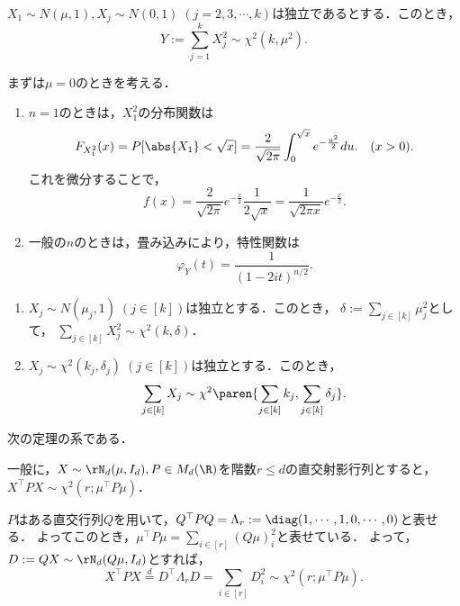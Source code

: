 \documentclass[uplatex,dvipdfmx]{jsreport}
\begin{document}
\begin{theorem}
    $X_1\sim N(\mu,1),X_j\sim N(0,1)\;(j=2,3,\cdots,k)$は独立であるとする．このとき，
    \[Y:=\sum_{j=1}^kX_j^2\sim\chi^2(k,\mu^2).\]
\end{theorem}
\begin{Proof}
    まずは$\mu=0$のときを考える．
    \begin{enumerate}
        \item $n=1$のときは，$X_1^2$の分布関数は
        \[F_{X_1^2}(x)=P[\abs{X_1}<\sqrt{x}]=\frac{2}{\sqrt{2\pi}}\int^{\sqrt{x}}_0e^{-\frac{u^2}{2}}du.\quad(x>0).\]
        これを微分することで，
        \[f(x)=\frac{2}{\sqrt{2\pi}}e^{-\frac{x}{2}}\frac{1}{2\sqrt{x}}=\frac{1}{\sqrt{2\pi x}}e^{-\frac{x}{2}}.\]
        \item 一般の$n$のときは，畳み込みにより，特性関数は
        \[\varphi_Y(t)=\frac{1}{(1-2it)^{n/2}}.\]
    \end{enumerate}
\end{Proof}

\begin{corollary}\mbox{}
    \begin{enumerate}
        \item $X_j\sim N(\mu_j,1)\;(j\in[k])$は独立とする．このとき，
        $\delta:=\sum_{j\in[k]}\mu_j^2$として，
        $\sum_{j\in[k]}X_j^2\sim\chi^2(k,\delta)$．
        \item $X_j\sim\chi^2(k_j,\delta_j)\;(j\in[k])$は独立とする．このとき，
        \[\sum_{j\in[k]}X_j\sim\chi^2\paren{\sum_{j\in[k]}k_j,\sum_{j\in[k]}\delta_j}.\]
    \end{enumerate}
\end{corollary}
\begin{Proof}
    次の定理の系である．
\end{Proof}

\begin{theorem}\label{thm-chi2-rv-from-normal-rv}
    一般に，$X\sim\rN_d(\mu,I_d),P\in M_d(\R)$を階数$r\le d$の直交射影行列とすると，$X^\top PX\sim\chi^2(r;\mu^\top P\mu)$．
\end{theorem}
\begin{Proof}
    $P$はある直交行列$Q$を用いて，$Q^\top PQ=\Lambda_r:=\diag(1,\cdots,1,0,\cdots,0)$と表せる．
    よってこのとき，$\mu^\top P\mu=\sum_{i\in[r]}(Q\mu)^2_i$と表せている．
    よって，$D:=QX\sim\rN_d(Q\mu,I_d)$とすれば，
    \[X^\top PX\overset{d}{=}D^\top\Lambda_rD=\sum_{i\in[r]}D_i^2\sim\chi^2(r;\mu^\top P\mu).\]
\end{Proof}
\end{document}
